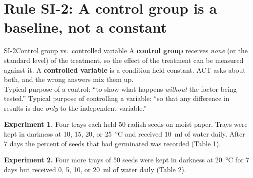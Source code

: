 \documentclass[11pt]{article}
\begin{document}
\section{Rule SI-2: A control group is a baseline, not a constant}

\begin{rulebox}{SI-2}{Control group vs.\ controlled variable}
A \textbf{control group} receives \emph{none} (or the standard level) of the treatment, so the effect of the treatment can be measured against it. A \textbf{controlled variable} is a condition held constant. ACT asks about both, and the wrong answers mix them up.\\
Typical purpose of a control: ``to show what happens \emph{without} the factor being tested.'' Typical purpose of controlling a variable: ``so that any difference in results is due \emph{only} to the independent variable.''
\end{rulebox}


\textbf{Experiment 1.} Four trays each held 50 radish seeds on moist paper. Trays were kept in darkness at 10, 15, 20, or \SI{25}{\celsius} and received \SI{10}{\milli\litre} of water daily. After 7 days the percent of seeds that had germinated was recorded (Table 1).

\textbf{Experiment 2.} Four more trays of 50 seeds were kept in darkness at \SI{20}{\celsius} for 7 days but received 0, 5, 10, or \SI{20}{\milli\litre} of water daily (Table 2).

\begin{minipage}[t]{0.48\linewidth}
\end{minipage}\hfill
\begin{minipage}[t]{0.48\linewidth}
\end{minipage}
\passageend
\end{document}
